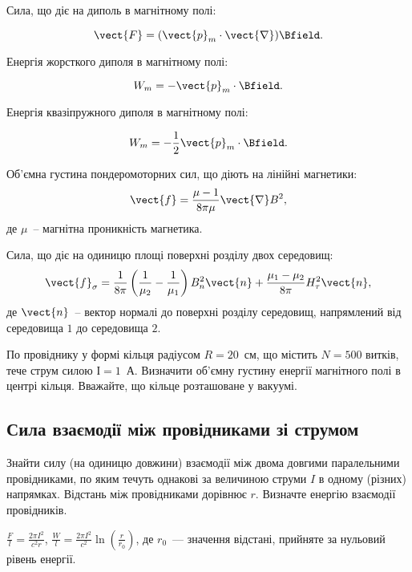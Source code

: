 \begin{Theory}
Сила, що діє на диполь в магнітному полі:

\begin{equation}
	\vect{F} = (\vect{p}_m\cdot\vect{\nabla})\Bfield.
\end{equation}

Енергія жорсткого диполя в магнітному полі:

\begin{equation}
	W_m = -\vect{p}_m\cdot\Bfield.
\end{equation}

Енергія квазіпружного диполя в магнітному полі:

\begin{equation}
	W_m = -\frac12 \vect{p}_m\cdot\Bfield.
\end{equation}

Об'ємна густина пондеромоторних сил, що діють на лінійні магнетики:
\begin{equation}
	\vect{f}  = \frac{\mu - 1}{8\pi\mu}\vect{\nabla}B^2,
\end{equation}
де $\mu$~-- магнітна проникність магнетика.

Сила, що діє на одиницю площі поверхні розділу двох середовищ:
\begin{equation}
	\vect{f}_{\sigma} = \frac{1}{8\pi}\left( \frac{1}{\mu_2} - \frac{1}{\mu_1} \right) B^2_n\vect{n} + \frac{\mu_1 - \mu_2}{8\pi} H^2_{\tau}\vect{n},
\end{equation}
де $\vect{n}$~-- вектор нормалі до поверхні розділу середовищ, напрямлений від середовища $1$ до середовища $2$.
\end{Theory}



\begin{problem}%
    По провіднику у формі кільця радіусом $R = 20$~см, що
містить $N = 500$ витків, тече струм силою $І = 1$~А. Визначити
об'ємну густину енергії магнітного полі в центрі кільця. Вважайте, що кільце розташоване у вакуумі.
%
\end{problem}


\subsection*{Сила взаємодії між провідниками зі струмом}



\begin{problem}
    Знайти силу (на одиницю довжини) взаємодії між двома довгими паралельними провідниками, по яким течуть однакові за величиною струми $I$ в одному (різних) напрямках.  Відстань між провідниками дорівнює $r$.  Визначте енергію взаємодії провідників.
\begin{solution}
	$\frac{F}{l} = \frac{2\pi I^2}{c^2r}$,
	$\frac{W}{l} = \frac{2\pi I^2}{c^2}\ln \left( \frac{r}{r_0}\right) $, де $r_0$~--- значення відстані, прийняте за нульовий рівень енергії.
\end{solution}
\end{problem}

